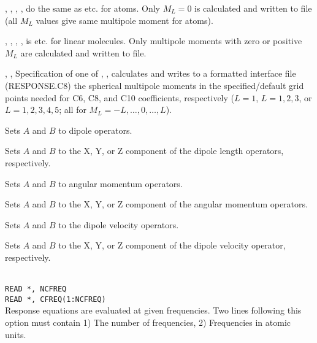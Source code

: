 \begin{description}

\item{, , }
, ,  do the same as  etc. for
atoms. Only $M_L=0$ is
calculated and written to file (all $M_L$ values give same multipole moment 
for atoms).

\item{, , }
, ,  is  etc. for linear
molecules. Only
multipole moments with zero or positive $M_L$
are calculated and written to file.

\item{, , }
Specification of one of , , 
calculates and writes to a formatted interface file (RESPONSE.C8) the spherical multipole
moments in the specified/default grid points needed for C6, C8, and C10
coefficients, respectively ($L=1$, $L=1,2,3$, or $L=1,2,3,4,5$;
all for $M_L = -L,\ldots,0,\ldots,L$).

\item{}
Sets $A$ and $B$ to dipole operators.

\item{}
Sets $A$ and $B$ to the X, Y, or Z component of the dipole length operators, respectively.

\item{}
Sets $A$ and $B$ to angular momentum operators.

\item{}
Sets $A$ and $B$ to the X, Y, or Z component of the angular momentum operators.

\item{}
Sets $A$ and $B$ to the dipole velocity operators.

\item{}
Sets $A$ and $B$ to the X, Y, or Z component of the dipole velocity
operator, respectively.

\item{}\\
\verb|READ *, NCFREQ|\\
\verb|READ *, CFREQ(1:NCFREQ)|\\
Response equations are evaluated at given
frequencies. Two lines following 
this option must contain 1) The number of frequencies, 2) Frequencies
in atomic units.


\end{description}
